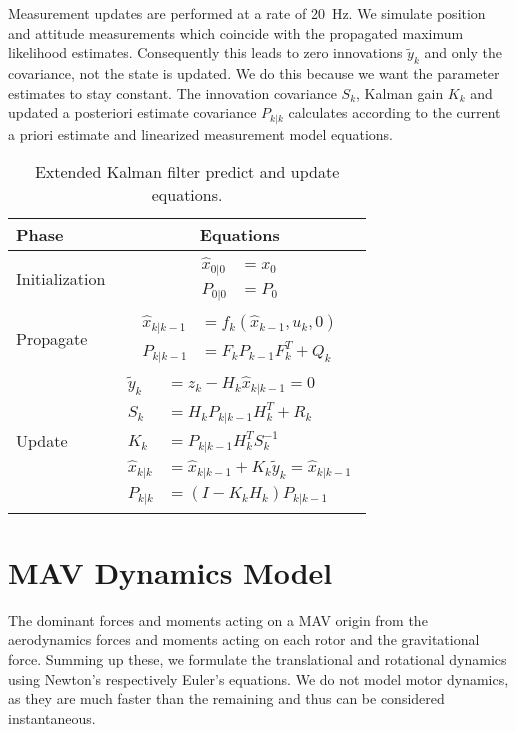 \documentclass[10pt,a4paper]{article}
\begin{document}
Measurement updates are performed at a rate of \SI{20}{\hertz}. We simulate position and attitude measurements which coincide with the propagated maximum likelihood estimates. Consequently this leads to zero innovations $\tilde{y}_k$ and only the covariance, not the state is updated. We do this because we want the parameter estimates to stay constant. The innovation covariance $S_k$, Kalman gain $K_k$ and updated a posteriori estimate covariance $P_{k|k}$ calculates according to the current a priori estimate and linearized measurement model equations.  

\begin{table}
\centering
\begin{tabular}{lc}
Phase & Equations \\
\hline   
Initialization & \parbox{7cm}{\begin{subequations} \begin{align} 
\hat{x}_{0|0} &= x_0 \\
P_{0|0} &= P_0
\end{align} \end{subequations}} \\
Propagate & \parbox{7cm}{\begin{subequations}\begin{align}
\hat{x}_{k|k-1} &= f_k(\hat{x}_{k-1}, u_k, 0) \label{eq:EKF:propagate:state}\\
P_{k|k-1} &= F_k P_{k-1} F^T_k + Q_k \label{eq:EKF:propagate:covariance}
\end{align}\end{subequations}}  \\
Update & \parbox{7cm}{\begin{subequations}\begin{align}
\tilde{y}_k &= z_k - H_k \hat{x}_{k|k-1} = 0 \\
S_k &= H_k P_{k|k-1} H^T_k + R_k \\
K_k &= P_{k|k-1} H^T_k S_k^{-1} \\
\hat{x}_{k|k} &= \hat{x}_{k|k-1} + K_k \tilde{y}_k = \hat{x}_{k|k-1} \\
P_{k|k} &= (I - K_k H_k) P_{k|k-1}
\end{align}\end{subequations}}
\end{tabular}
\caption{Extended Kalman filter predict and update equations. \label{tab:EKF}}
\end{table}

\section{MAV Dynamics Model}
The dominant forces and moments acting on a MAV origin from the aerodynamics forces and moments acting on each rotor and the gravitational force. Summing up these, we formulate the translational and rotational dynamics using Newton's respectively Euler's equations. We do not model motor dynamics, as they are much faster than the remaining and thus can be considered instantaneous.
\end{document}

